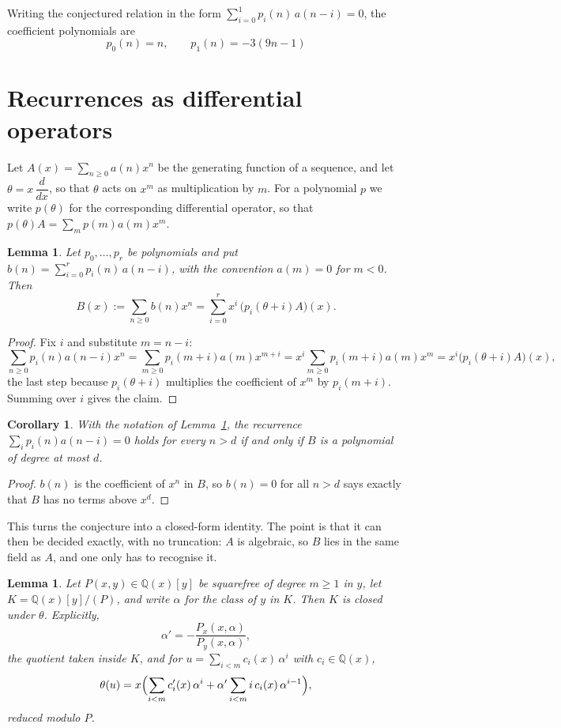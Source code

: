 \documentclass[11pt,a4paper]{article}
\theoremstyle{plain}
\newtheorem{lemma}[theorem]{Lemma}
\newtheorem{corollary}[theorem]{Corollary}
\theoremstyle{definition}
\begin{document}
Writing the conjectured relation in the form $\sum_{i=0}^{1}p_{i}(n)\,a(n-i)=0$,
the coefficient polynomials are
\[
p_{0}(n)=n,\qquad p_{1}(n)=- 3 \left(9 n - 1\right)
\]

\section{Recurrences as differential operators}

Let $A(x)=\sum_{n\ge0}a(n)x^{n}$ be the generating function of a sequence, and let
$\theta=x\,\dfrac{d}{dx}$, so that $\theta$ acts on $x^{m}$ as multiplication by $m$. For a
polynomial $p$ we write $p(\theta)$ for the corresponding differential operator, so that
$p(\theta)A=\sum_{m}p(m)a(m)x^{m}$.

\begin{lemma}\label{lem:transfer}
Let $p_{0},\dots,p_{r}$ be polynomials and put $b(n)=\sum_{i=0}^{r}p_{i}(n)\,a(n-i)$, with
the convention $a(m)=0$ for $m<0$. Then
\[
B(x):=\sum_{n\ge0}b(n)x^{n}=\sum_{i=0}^{r}x^{i}\,\bigl(p_{i}(\theta+i)A\bigr)(x).
\]
\end{lemma}

\begin{proof}
Fix $i$ and substitute $m=n-i$:
\[
\sum_{n\ge0}p_{i}(n)a(n-i)x^{n}=\sum_{m\ge0}p_{i}(m+i)a(m)x^{m+i}
=x^{i}\sum_{m\ge0}p_{i}(m+i)a(m)x^{m}=x^{i}\bigl(p_{i}(\theta+i)A\bigr)(x),
\]
the last step because $p_{i}(\theta+i)$ multiplies the coefficient of $x^{m}$ by
$p_{i}(m+i)$. Summing over $i$ gives the claim.
\end{proof}

\begin{corollary}\label{cor:criterion}
With the notation of Lemma~\ref{lem:transfer}, the recurrence
$\sum_{i}p_{i}(n)a(n-i)=0$ holds for every $n>d$ if and only if $B$ is a polynomial of
degree at most $d$.
\end{corollary}

\begin{proof}
$b(n)$ is the coefficient of $x^{n}$ in $B$, so $b(n)=0$ for all $n>d$ says exactly that
$B$ has no terms above $x^{d}$.
\end{proof}

This turns the conjecture into a closed-form identity. The point is that it can then be
decided exactly, with no truncation: $A$ is algebraic, so $B$ lies in the same field as
$A$, and one only has to recognise it.

\begin{lemma}\label{lem:field}
Let $P(x,y)\in\mathbb{Q}(x)[y]$ be squarefree of degree $m\ge1$ in $y$, let
$K=\mathbb{Q}(x)[y]/(P)$, and write $\alpha$ for the class of $y$ in $K$. Then $K$ is
closed under $\theta$. Explicitly,
\[
\alpha'=-\frac{P_{x}(x,\alpha)}{P_{y}(x,\alpha)},
\]
the quotient taken inside $K$, and for $u=\sum_{i<m}c_{i}(x)\,\alpha^{i}$ with
$c_{i}\in\mathbb{Q}(x)$,
\[
\theta(u)=x\Bigl(\sum_{i<m}c_{i}'(x)\,\alpha^{i}
 +\alpha'\sum_{i<m}i\,c_{i}(x)\,\alpha^{i-1}\Bigr),
\]
reduced modulo $P$.
\end{lemma}
\end{document}

